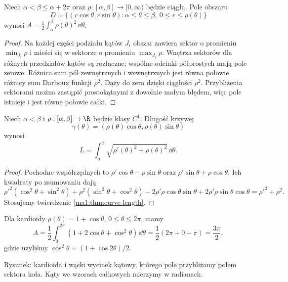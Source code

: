 \begin{twierdzenie}
\label{ma1:thm:polar-area}
Niech $\alpha<\beta\le\alpha+2\pi$ oraz $\rho:[\alpha,\beta]\to[0,\infty)$ będzie ciągła. Pole obszaru
\[
 D=\{(r\cos\theta,r\sin\theta):\alpha\le\theta\le\beta,\ 0\le r\le\rho(\theta)\}
\]
wynosi $A=\tfrac12\int_\alpha^\beta\rho(\theta)^2\,\dd\theta$.
\end{twierdzenie}
\begin{proof}
Na każdej części podziału kątów $J_i$ obszar zawiera sektor o promieniu $\min_{J_i}\rho$ i mieści się w sektorze o promieniu $\max_{J_i}\rho$. Wnętrza sektorów dla różnych przedziałów kątów są rozłączne; wspólne odcinki półprostych mają pole zerowe. Różnica sum pól zewnętrznych i wewnętrznych jest równa połowie różnicy sum Darboux funkcji $\rho^2$. Dąży do zera dzięki ciągłości $\rho^2$. Przybliżenia sektorami można zastąpić prostokątnymi z dowolnie małym błędem, więc pole istnieje i jest równe połowie całki.
\end{proof}
\begin{wniosek}
\label{ma1:cor:polar-length}
Niech $\alpha<\beta$ i $\rho:[\alpha,\beta]\to\R$ będzie klasy $C^1$. Długość krzywej
\[
 \gamma(\theta)=(\rho(\theta)\cos\theta,\rho(\theta)\sin\theta)
\]
wynosi
\[
 L=\int_\alpha^\beta\sqrt{\rho'(\theta)^2+\rho(\theta)^2}\,\dd\theta.
\]
\end{wniosek}
\begin{proof}
Pochodne współrzędnych to $\rho'\cos\theta-\rho\sin\theta$ oraz $\rho'\sin\theta+\rho\cos\theta$. Ich kwadraty po zsumowaniu dają
\[
 \rho'^2(\cos^2\theta+\sin^2\theta)
 +\rho^2(\sin^2\theta+\cos^2\theta)
 -2\rho'\rho\cos\theta\sin\theta+2\rho'\rho\sin\theta\cos\theta
 =\rho'^2+\rho^2.
\] Stosujemy twierdzenie \ref{ma1:thm:curve-length}.
\end{proof}
\begin{przyklad}
\label{ma1:ex:cardioid-area}
Dla kardioidy $\rho(\theta)=1+\cos\theta$, $0\le\theta\le2\pi$, mamy
\[
 A=\frac12\int_0^{2\pi}(1+2\cos\theta+\cos^2\theta)\,\dd\theta
 =\frac12(2\pi+0+\pi)=\frac{3\pi}{2},
\]
gdzie użyliśmy $\cos^2\theta=(1+\cos2\theta)/2$.
\end{przyklad}
\begin{center}

\small Rysunek: kardioida i wąski wycinek kątowy, którego pole przybliżamy polem sektora koła. Kąty we wzorach całkowych mierzymy w radianach.
\end{center}

